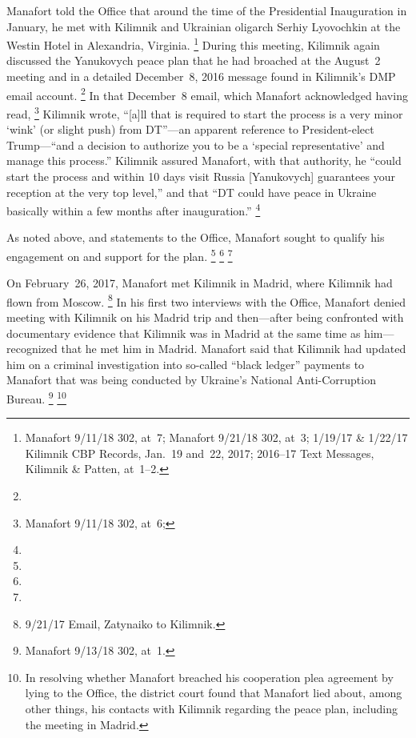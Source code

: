 Manafort told the Office that around the time of the Presidential Inauguration in January, he met with Kilimnik and Ukrainian oligarch Serhiy Lyovochkin at the Westin Hotel in Alexandria, Virginia.%
\footnote{ Manafort 9/11/18 302, at~7;
Manafort 9/21/18 302, at~3;
1/19/17 \& 1/22/17 Kilimnik CBP Records, Jan.~19 and~22, 2017;
2016--17 Text Messages, Kilimnik \& Patten, at~1--2.}
During this meeting, Kilimnik again discussed the Yanukovych peace plan that he had broached at the August~2 meeting and in a detailed December~8, 2016 message found in Kilimnik's DMP email account.%
\footnote{}
In that December~8 email, which Manafort acknowledged having read,%
\footnote{Manafort 9/11/18 302, at~6;
}
Kilimnik wrote, ``[a]ll that is required to start the process is a very minor `wink' (or slight push) from DT''---an apparent reference to President-elect Trump---``and a decision to authorize you to be a `special representative' and manage this process.''
Kilimnik assured Manafort, with that authority, he ``could start the process and within 10 days visit Russia [Yanukovych] guarantees your reception at the very top level,'' and that ``DT could have peace in Ukraine basically within a few months after inauguration.''%
\footnote{}

As noted above,
and statements to the Office, Manafort sought to qualify his engagement on and support for the plan.
\footnote{}
\footnote{}
\footnote{}

On February~26, 2017, Manafort met Kilimnik in Madrid, where Kilimnik had flown from Moscow.%
\footnote{9/21/17 Email, Zatynaiko to Kilimnik.}
In his first two interviews with the Office, Manafort denied meeting with Kilimnik on his Madrid trip and then---after being confronted with documentary evidence that Kilimnik was in Madrid at the same time as him---recognized that he met him in Madrid.
Manafort said that Kilimnik had updated him on a criminal investigation into so-called ``black ledger'' payments to Manafort that was being conducted by Ukraine's National Anti-Corruption Bureau.%
\footnote{Manafort 9/13/18 302, at~1.}
\footnote{ In resolving whether Manafort breached his cooperation plea agreement by lying to the Office, the district court found that Manafort lied about, among other things, his contacts with Kilimnik regarding the peace plan, including the meeting in Madrid.}

